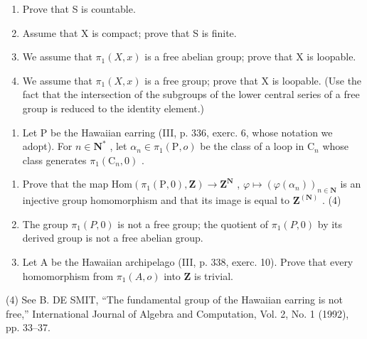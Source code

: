 \begin{enumerate}
\def\labelenumi{\alph{enumi})}
\item
  Prove that S is countable.
\item
  Assume that X is compact; prove that S is finite.
\item
  We assume that \(\pi_{1}(X,x)\) is a free abelian group; prove that X is loopable.
\item
  We assume that \(\pi_{1}(X,x)\) is a free group; prove that X is loopable. (Use the fact that the intersection of the subgroups of the lower central series of a free group is reduced to the identity element.)
\end{enumerate}

\begin{enumerate}
\def\labelenumi{\arabic{enumi})}
\setcounter{enumi}{4}
\tightlist
\item
  Let P be the Hawaiian earring (III, p. 336, exerc. 6, whose notation we adopt). For \(n \in \mathbf{N}^*\) , let \(\alpha_n \in \pi_1(\mathrm{P}, o)\) be the class of a loop in \(\mathrm{C}_n\) whose class generates \(\pi_1(\mathrm{C}_n, 0)\) .
\end{enumerate}

\begin{enumerate}
\def\labelenumi{\alph{enumi})}
\item
  Prove that the map \(\mathrm{Hom}(\pi_{1}(\mathrm{P},0),\mathbf{Z})\to\mathbf{Z}^{\mathbf{N}}\) , \(\varphi\mapsto(\varphi(\alpha_{n}))_{n\in\mathbf{N}}\) is an injective group homomorphism and that its image is equal to \(\mathbf{Z}^{(\mathbf{N})}\) . (4)
\item
  The group \(\pi_{1}(P,0)\) is not a free group; the quotient of \(\pi_{1}(P,0)\) by its derived group is not a free abelian group.
\item
  Let A be the Hawaiian archipelago (III, p. 338, exerc. 10). Prove that every homomorphism from \(\pi_1(A, o)\) into \(\mathbf{Z}\) is trivial.
\end{enumerate}

(4) See B. DE SMIT, “The fundamental group of the Hawaiian earring is not free,” International Journal of Algebra and Computation, Vol. 2, No. 1 (1992), pp. 33–37.

